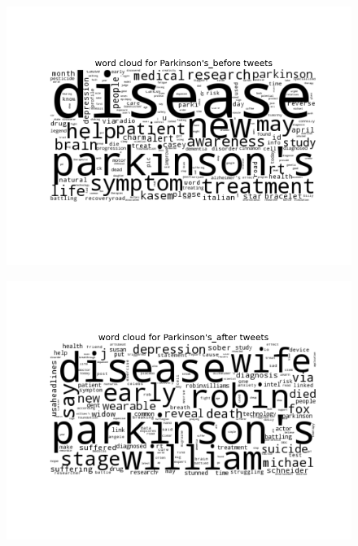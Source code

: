 \documentclass[11pt, oneside]{article}   	%
\begin{document}
 \begin{figure}
 \includegraphics[width=\textwidth]{../figures/Parkinson's_before.png}
 \centering
 \end{figure}

 \begin{figure}
 \includegraphics[width=\textwidth]{../figures/Parkinson's_after.png}
 \centering
 \end{figure}
\end{document}
